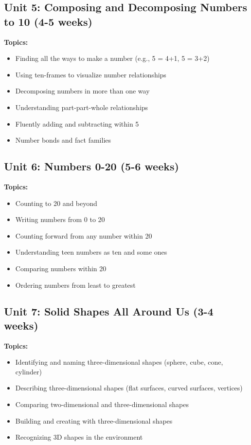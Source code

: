 \documentclass[11pt,letterpaper]{report}
\begin{document}
\subsection{Unit 5: Composing and Decomposing Numbers to 10 (4-5 weeks)}

\textbf{Topics:}
\begin{itemize}
    \item Finding all the ways to make a number (e.g., 5 = 4+1, 5 = 3+2)
    \item Using ten-frames to visualize number relationships
    \item Decomposing numbers in more than one way
    \item Understanding part-part-whole relationships
    \item Fluently adding and subtracting within 5
    \item Number bonds and fact families
\end{itemize}

\subsection{Unit 6: Numbers 0-20 (5-6 weeks)}

\textbf{Topics:}
\begin{itemize}
    \item Counting to 20 and beyond
    \item Writing numbers from 0 to 20
    \item Counting forward from any number within 20
    \item Understanding teen numbers as ten and some ones
    \item Comparing numbers within 20
    \item Ordering numbers from least to greatest
\end{itemize}

\subsection{Unit 7: Solid Shapes All Around Us (3-4 weeks)}

\textbf{Topics:}
\begin{itemize}
    \item Identifying and naming three-dimensional shapes (sphere, cube, cone, cylinder)
    \item Describing three-dimensional shapes (flat surfaces, curved surfaces, vertices)
    \item Comparing two-dimensional and three-dimensional shapes
    \item Building and creating with three-dimensional shapes
    \item Recognizing 3D shapes in the environment
\end{itemize}
\end{document}
